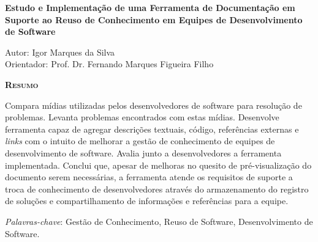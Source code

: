 \begin{center}
	{\Large{\textbf{Estudo e Implementação de uma Ferramenta de Documentação em Suporte ao Reuso de Conhecimento em Equipes de Desenvolvimento de Software}}}
\end{center}

\vspace{1cm}

\begin{flushright}
	Autor: Igor Marques da Silva\\
	Orientador: Prof. Dr. Fernando Marques Figueira Filho
\end{flushright}

\vspace{1cm}

\begin{center}
	\Large{\textsc{\textbf{Resumo}}}
\end{center}

\noindent Compara mídias utilizadas pelos desenvolvedores de software para resolução de problemas. Levanta problemas encontrados com estas mídias. Desenvolve ferramenta capaz de agregar descrições textuais, código, referências externas e \textit{links} com o intuito de melhorar a gestão de conhecimento de equipes de  desenvolvimento de software. Avalia junto a desenvolvedores a ferramenta implementada. Conclui que, apesar de melhoras no quesito de pré-visualização do documento serem necessárias, a ferramenta atende os requisitos de suporte a troca de conhecimento de desenvolvedores através do armazenamento do registro de soluções e compartilhamento de informações e  referências para a equipe.

\noindent\textit{Palavras-chave}: Gestão de Conhecimento, Reuso de Software, Desenvolvimento de Software.

